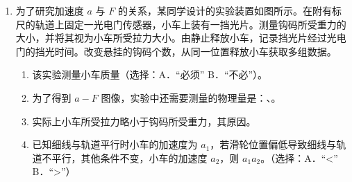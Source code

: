 \documentclass[\gkver]{gaokaozhenti}
\begin{document}
\begin{enumerate}
{$p_{0}h_{0}S = (p_{0} + \frac{mg}{S})hS$

解得：$m = \frac{p_{0}h_{0}S}{g}\cdot\frac{1}{h} - \frac{p_{0}S}{g}$

$k = \frac{p_{0}h_{0}S}{g}$，$b = -\frac{p_{0}S}{g}$

即 $p_{0} = -\frac{bg}{S}$，$h_{0} = -\frac{k}{b}$
}

\item
为了研究加速度 $a$ 与 $F$ 的关系，某同学设计的实验装置如图所示。在附有标尺的轨道上固定一光电门传感器，小车上装有一挡光片。测量钩码所受重力的大小，并将其视为小车所受拉力大小。由静止释放小车，记录挡光片经过光电门的挡光时间。改变悬挂的钩码个数，从同一位置释放小车获取多组数据。
\begin{enumerate}
	\item
	该实验测量小车质量（选择：A．“必须”   B．“不必”）。
	\item
	为了得到 $a-F$ 图像，实验中还需要测量的物理量是：、。
	\item
	实际上小车所受拉力略小于钩码所受重力，其原因\newline{}。
	\item
	已知细线与轨道平行时小车的加速度为 $a_{1}$，若滑轮位置偏低导致细线与轨道不平行，其他条件不变，小车的加速度 $a_{2}$，则 $a_{1}$$a_{2}$。（选择：A．“<”       B．“>”）
\end{enumerate}
\onepicture[w=6.5cm, align=right]{}
\end{enumerate}
\end{document}
